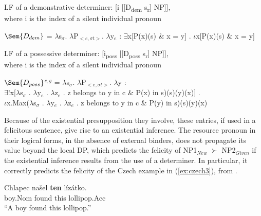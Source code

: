 \documentclass[output=paper,modfonts,nonflat]{langsci/langscibook}
\begin{document}
\ea LF of a demonstrative determiner:
[i [[D\textsubscript{dem} s\textsubscript{r}] NP]],\\
where i is the index of a silent individual pronoun
\z

\ea
$\Sem{D_{dem}}$ = $\lambda$s$_{\sigma}$. $\lambda$P$_{<e,\sigma t>}$. $\lambda$y$_{e}$ : $\exists$x[P(x)(s) \& x = y] . $\iota$x[P(x)(s) \& x = y] \label{definition:demonstrative}
\z


\ea LF of a possessive determiner:
[i\textsubscript{poss} [[D\textsubscript{poss} s\textsubscript{r}] NP]],\\
where i is the index of a silent individual pronoun
\z

\ea
$\Sem{D_{poss}}$$^{c,g}$ = $\lambda$s$_{\sigma}$. $\lambda$P$_{<e,\sigma t>}$. $\lambda$y : \label{definition:possessive}\\
$\exists$!x[$\lambda$s$_{\sigma}$ . $\lambda$y$_{e}$ . $\lambda$z$_{e}$ .  z belongs to y in c \& P(x) in s)(s)(y)(x)] .\\
$\iota$x.Max($\lambda$s$_{\sigma}$ . $\lambda$y$_{e}$ . $\lambda$z$_{e}$ . z belongs to y in c \& P(y) in s)(s)(y)(x)
\z

Because of the existential presupposition they involve, these entries, if used in a felicitous sentence, give rise to an existential inference. The resource pronoun in their logical forms, in the absence of external binders, does not propagate its value beyond the local DP, which predicts the felicity of NP1$_{New}$ $\succ$ NP2$_{Given}$ if the existential inference results from the use of a determiner. In particular, it correctly predicts the felicity of the Czech example in (\ref{ex:czech3}), from \citet{Kucerova:2012}.

\ea \label{ex:czech3} 
\gll Chlapec na\v{s}el {\bfseries ten} l\'{i}z\'{a}tko.\\
boy.Nom found this lollipop.Acc\\
\glt ``A boy found this lollipop.''
\z


\end{document}
